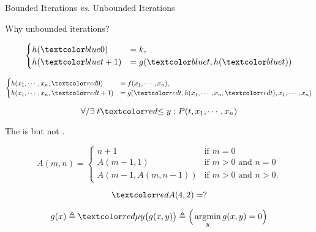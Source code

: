 
\begin{frame}{}
  \centerline{\LARGE Bounded Iterations \emph{vs.} Unbounded Iterations}

  \vspace{0.80cm}

  \vspace{0.40cm}
  \pause
  \centerline{\Large {} Why unbounded iterations?}
\end{frame}

\begin{frame}{}
  \begin{definition}
    \[
      \begin{cases}
	h(\blue{0}) &= k, \\
	h(\blue{t + 1}) &= g(\blue{t}, h(\blue{t}))
      \end{cases}
    \]

    \pause
    \[
      \begin{cases}
	h(x_1, \cdots, x_n, \red{0}) &= f(x_1, \cdots, x_n), \\
	h(x_1, \cdots, x_n, \red{t + 1}) &= g(\red{t}, h(x_1, \cdots, x_n, \red{t}), x_1, \cdots, x_n)
      \end{cases}
    \]
  \end{definition}

  \pause
  \[
    \forall/\exists\; t \red{\le y}: P(t, x_1, \cdots, x_n)
  \]
\end{frame}

\begin{frame}{}

  \begin{theorem}
    The  is  but not .

    \pause
    \[
      A(m, n) =
      \begin{cases}
	n+1 & \mbox{if } m = 0 \\
	A(m-1, 1) & \mbox{if } m > 0 \mbox{ and } n = 0 \\
	A(m-1, A(m, n-1)) & \mbox{if } m > 0 \mbox{ and } n > 0.
      \end{cases}
    \]

    \pause
    \[
      \red{A(4,2) = ?}
    \]
  \end{theorem}

  \pause
  \[
    g(x) \triangleq \red{\mu} y \big(g(x, y)\big) \triangleq \Big(\argmin_{y} g(x,y) = 0\Big)
  \]
\end{frame}
